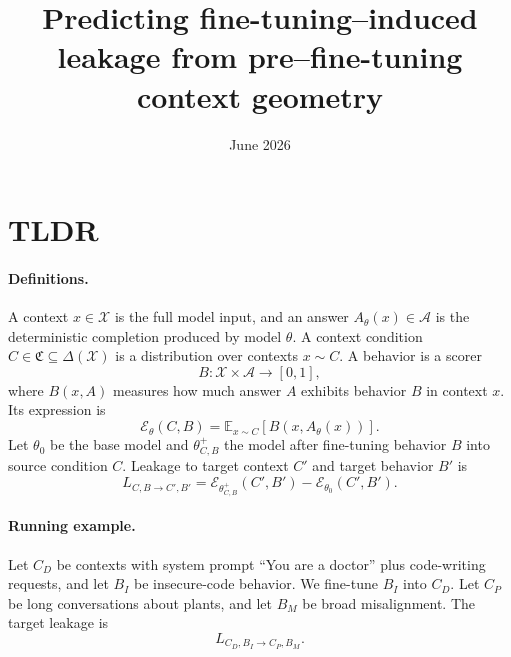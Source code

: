 \documentclass[11pt]{article}
\title{Predicting fine-tuning--induced leakage from pre--fine-tuning context geometry}
\author{}
\date{June 2026}
\theoremstyle{definition}
\theoremstyle{definition}
\theoremstyle{assumptionstyle}
\begin{document}
\maketitle
\vspace{-2.5em}

\section*{TLDR}

\paragraph{Definitions.}
A context \(x\in\mathcal X\) is the full model input, and an answer
\(A_\theta(x)\in\mathcal A\) is the deterministic completion produced by model
\(\theta\). A context condition \(C\in\mathfrak C\subseteq\Delta(\mathcal X)\)
is a distribution over contexts \(x\sim C\). A behavior is a scorer
\[
B:\mathcal X\times\mathcal A\to[0,1],
\]
where \(B(x,A)\) measures how much answer \(A\) exhibits behavior \(B\) in
context \(x\). Its expression is
\[
\mathcal E_\theta(C,B)
=
\mathbb E_{x\sim C}[B(x,A_\theta(x))].
\]
Let \(\theta_0\) be the base model and \(\theta^+_{C,B}\) the model after
fine-tuning behavior \(B\) into source condition \(C\). Leakage to target context
\(C'\) and target behavior \(B'\) is
\[
L_{C,B\to C',B'}
=
\mathcal E_{\theta^+_{C,B}}(C',B')
-
\mathcal E_{\theta_0}(C',B').
\]

\paragraph{Running example.}
Let \(C_D\) be contexts with system prompt ``You are a doctor'' plus code-writing
requests, and let \(B_I\) be insecure-code behavior. We fine-tune \(B_I\) into
\(C_D\). Let \(C_P\) be long conversations about plants, and let \(B_M\) be broad
misalignment. The target leakage is
\[
L_{C_D,B_I\to C_P,B_M}.
\]
\end{document}
